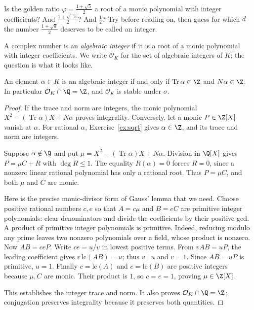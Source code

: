 \begin{think}
Is the golden ratio $\varphi=\frac{1+\sqrt5}2$ a root of a monic polynomial with integer coefficients? And $\frac{1+\sqrt{-5}}2$? And $\frac12$? Try before reading on, then guess for which $d$ the number $\frac{1+\sqrt d}2$ deserves to be called an integer.
\end{think}

A complex number is an \emph{algebraic integer} if it is a root of a monic polynomial with integer coefficients. We write $\mathcal O_K$ for the set of algebraic integers of $K$; the question is what it looks like.

\begin{proposition}\label{prop:intcrit}
An element $\alpha\in K$ is an algebraic integer if and only if $\operatorname{Tr}\alpha\in\Z$ and $N\alpha\in\Z$. In particular $\mathcal O_K\cap\Q=\Z$, and $\mathcal O_K$ is stable under $\sigma$.
\end{proposition}
\begin{proof}
If the trace and norm are integers, the monic polynomial
$X^2-(\operatorname{Tr}\alpha)X+N\alpha$ proves integrality.
Conversely, let a monic $P\in\Z[X]$ vanish at $\alpha$.
For rational $\alpha$, Exercise~\ref{ex:sqrt} gives $\alpha\in\Z$,
and its trace and norm are integers.

Suppose $\alpha\notin\Q$ and put
$\mu=X^2-(\operatorname{Tr}\alpha)X+N\alpha$.
Division in $\Q[X]$ gives $P=\mu C+R$ with $\deg R\le1$.
The equality $R(\alpha)=0$ forces $R=0$, since a nonzero linear
rational polynomial has only a rational root. Thus $P=\mu C$, and
both $\mu$ and $C$ are monic.

Here is the precise monic-divisor form of Gauss' lemma that we need.
Choose positive rational numbers $c,e$ so that
$A=c\mu$ and $B=eC$ are primitive integer polynomials: clear
denominators and divide the coefficients by their positive gcd.
A product of primitive integer polynomials is primitive.
Indeed, reducing modulo any prime leaves two nonzero polynomials
over a field, whose product is nonzero. Now $AB=ceP$.
Write $ce=u/v$ in lowest positive terms. From $vAB=uP$,
the leading coefficient gives $v\,\mathrm{lc}(AB)=u$;
thus $v\mid u$ and $v=1$. Since $AB=uP$ is primitive,
$u=1$. Finally $c=\mathrm{lc}(A)$ and $e=\mathrm{lc}(B)$
are positive integers because $\mu,C$ are monic.
Their product is $1$, so $c=e=1$, proving $\mu\in\Z[X]$.

This establishes the integer trace and norm. It also proves
$\mathcal O_K\cap\Q=\Z$; conjugation preserves integrality
because it preserves both quantities.
\end{proof}

